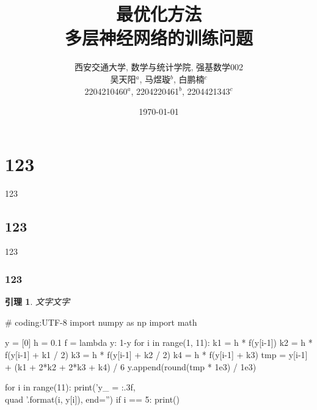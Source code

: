 \documentclass[12pt, a4paper, oneside]{ctexart}
\newtheorem{lemma}{引理}
\numberwithin{equation}{section}  %
\begin{document}
\title{最优化方法\\多层神经网络的训练问题}
\author{
西安交通大学, 数学与统计学院, 强基数学002\\[1ex]
吴天阳$^a$, 马煜璇$^b$, 白鹏楠$^c$\\[1ex]
2204210460$^a$, 2204220461$^b$, 2204421343$^c$
}
\date{\today}

\maketitle %
\clearpage %
\tableofcontents %

\clearpage
\section{123}
123
\subsection{123}
123
\subsubsection{123}
\begin{lemma}
    文字文字
\end{lemma}

\begin{pythoncode}
# coding:UTF-8
import numpy as np
import math

y = [0]
h = 0.1
f = lambda y: 1-y
for i in range(1, 11):
    k1 = h * f(y[i-1])
    k2 = h * f(y[i-1] + k1 / 2)
    k3 = h * f(y[i-1] + k2 / 2)
    k4 = h * f(y[i-1] + k3)
    tmp = y[i-1] + (k1 + 2*k2 + 2*k3 + k4) / 6
    y.append(round(tmp * 1e3) / 1e3)

for i in range(11):
    print('y_{{{}}} = {:.3f},\\quad '.format(i, y[i]), end='')
    if i == 5:
        print()
\end{pythoncode}
\end{document}
